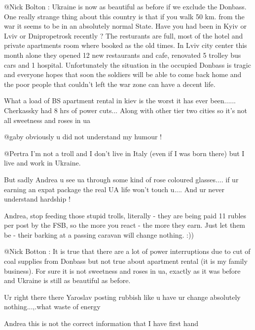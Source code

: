 \begin{itemize}
\begin{itemize}

@Nick Bolton : Ukraine is now as beautiful as before if we exclude the Donbass.
One really strange thing about this country is that if you walk 50 km. from the
war it seems to be in an absolutely normal State. Have you had been in Kyiv or
Lviv or Dnipropetrosk recently ? The resturants are full, most of the hotel and
private apartments room where booked as the old times. In Lviv city center this
month alone they opened 12 new restaurants and cafe, renovated 5 trolley bus
cars and 1 hospital. Unfortunately the situation in the occupied Donbass is
tragic and everyone hopes that soon the soldiers will be able to come back home
and the poor people that couldn't left the war zone can have a decent life.


What a load of BS apartment rental in kiev is the worst it has ever been......
Cherkassky had 8 hrs of power cuts... Along with other tier two cities so it's
not all sweetness and roses in ua

@gaby obviously u did not understand my humour !

@Pertra I'm not a troll and I don't live in Italy (even if I was born there) but I live and work in Ukraine.

But sadly Andrea u see ua through some kind of rose coloured glasses.... if ur earning an expat package the real UA life won't touch u.... And ur never understand hardship !


Andrea, stop feeding those stupid trolls, literally - they are being paid 11
rubles per post by the FSB, so the more you react - the more they earn. Just
let them be - their barking at a passing caravan will change nothing. :))


@Nick Botton : It is true that there are a lot of power interruptions due to
cut of coal supplies from Donbass but not true about apartment rental (it is my
family business). For sure it is not sweetness and roses in ua, exactly as it
was before and Ukraine is still as beautiful as before.

Ur right there there Yaroslav posting rubbish like u have ur change absolutely nothing...,.what waste of energy

Andrea this is not the correct information that I have first hand


\end{itemize}
\end{itemize}
